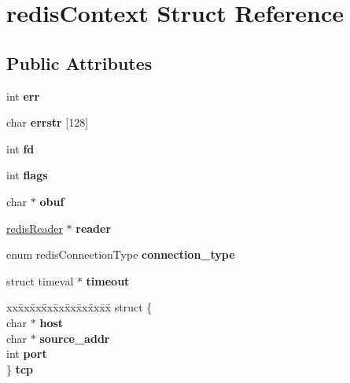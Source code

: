 \hypertarget{structredis_context}{}\section{redis\+Context Struct Reference}
\label{structredis_context}
\subsection*{Public Attributes}
\begin{DoxyCompactItemize}
\item 
\mbox{\label{structredis_context_a481fce8ff0dcee335303d1422ec95444}} 
int {\bfseries err}
\item 
\mbox{\label{structredis_context_ace3136a9fe419c796e14fab570eac9c4}} 
char {\bfseries errstr} \mbox{[}128\mbox{]}
\item 
\mbox{\label{structredis_context_af9a3bb9074cc05736a673fcf2961c2aa}} 
int {\bfseries fd}
\item 
\mbox{\label{structredis_context_aafd5c9d13dadbd055a8b9607cfd2ee81}} 
int {\bfseries flags}
\item 
\mbox{\label{structredis_context_a8cab702896e62569c6e44add76157579}} 
char $\ast$ {\bfseries obuf}
\item 
\mbox{\label{structredis_context_aae7381e81e013938a73d661eab41f699}} 
\mbox{\hyperlink{structredis_reader}{redis\+Reader}} $\ast$ {\bfseries reader}
\item 
\mbox{\label{structredis_context_ae7324da0f5ca2e9f5d64db2cffd607dc}} 
enum redis\+Connection\+Type {\bfseries connection\+\_\+type}
\item 
\mbox{\label{structredis_context_a9269266b4f459b0e0dc7603a4bd946fb}} 
struct timeval $\ast$ {\bfseries timeout}
\item 
\mbox{\label{structredis_context_a2cd43e1943e302bb818908c9bd6bd633}} 
\begin{tabbing}
xx\=xx\=xx\=xx\=xx\=xx\=xx\=xx\=xx\=\kill
struct \{\\
\>char $\ast$ {\bfseries host}\\
\>char $\ast$ {\bfseries source\_addr}\\
\>int {\bfseries port}\\
\} {\bfseries tcp}\\


\end{tabbing}
\end{DoxyCompactItemize}
